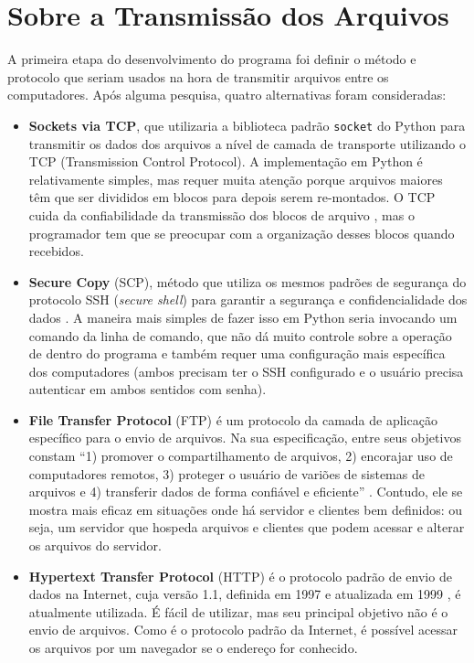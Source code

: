 \documentclass[12pt,a4paper]{ufpr}
\begin{document}
\section{Sobre a Transmissão dos Arquivos}
A primeira etapa do desenvolvimento do programa foi definir o método e protocolo que seriam usados na hora de transmitir arquivos entre os computadores.
Após alguma pesquisa, quatro alternativas foram consideradas: 
\begin{itemize}
  \item \textbf{Sockets via TCP}, que utilizaria a biblioteca padrão \texttt{socket} do Python \cite{pythonsockets} para transmitir os dados dos arquivos a nível de camada de transporte utilizando o TCP (Transmission Control Protocol). A implementação em Python é relativamente simples, mas requer muita atenção porque arquivos maiores têm que ser divididos em blocos para depois serem re-montados. O TCP cuida da confiabilidade da transmissão dos blocos de arquivo \cite{cerf2005protocol}, mas o programador tem que se preocupar com a organização desses blocos quando recebidos.
  \item \textbf{Secure Copy} (SCP), método que utiliza os mesmos padrões de segurança do protocolo SSH (\textit{secure shell}) para garantir a segurança e confidencialidade dos dados \cite{scpcommand}. A maneira mais simples de fazer isso em Python seria invocando um comando da linha de comando, que não dá muito controle sobre a operação de dentro do programa e também requer uma configuração mais específica dos computadores (ambos precisam ter o SSH configurado e o usuário precisa autenticar em ambos sentidos com senha).
  \item \textbf{File Transfer Protocol} (FTP) é um protocolo da camada de aplicação específico para o envio de arquivos. Na sua especificação, entre seus objetivos constam ``1) promover o compartilhamento de arquivos, 2) encorajar uso de computadores remotos, 3) proteger o usuário de variões de sistemas de arquivos e 4) transferir dados de forma confiável e eficiente'' \cite{rfc959}. Contudo, ele se mostra mais eficaz em situações onde há servidor e clientes bem definidos: ou seja, um servidor que hospeda arquivos e clientes que podem acessar e alterar os arquivos do servidor.
  \item \textbf{Hypertext Transfer Protocol} (HTTP) é o protocolo padrão de envio de dados na Internet, cuja versão 1.1, definida em 1997 e atualizada em 1999 \cite{rfc2616}, é atualmente utilizada. É fácil de utilizar, mas seu principal objetivo não é o envio de arquivos. Como é o protocolo padrão da Internet, é possível acessar os arquivos por um navegador se o endereço for conhecido.
\end{itemize}
\end{document}
